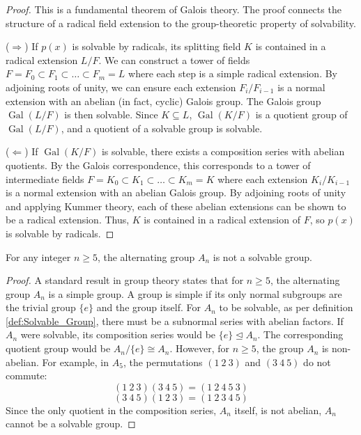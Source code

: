 \begin{proof}
    This is a fundamental theorem of Galois theory. The proof connects the structure of a radical field extension to the group-theoretic property of solvability.

    ($\Rightarrow$) If $p(x)$ is solvable by radicals, its splitting field $K$ is contained in a radical extension $L/F$. We can construct a tower of fields $F=F_0 \subset F_1 \subset \dots \subset F_m=L$ where each step is a simple radical extension. By adjoining roots of unity, we can ensure each extension $F_i/F_{i-1}$ is a normal extension with an abelian (in fact, cyclic) Galois group. The Galois group $\operatorname{Gal}(L/F)$ is then solvable. Since $K \subseteq L$, $\operatorname{Gal}(K/F)$ is a quotient group of $\operatorname{Gal}(L/F)$, and a quotient of a solvable group is solvable.

    ($\Leftarrow$) If $\operatorname{Gal}(K/F)$ is solvable, there exists a composition series with abelian quotients. By the Galois correspondence, this corresponds to a tower of intermediate fields $F=K_0 \subset K_1 \subset \dots \subset K_m=K$ where each extension $K_i/K_{i-1}$ is a normal extension with an abelian Galois group. By adjoining roots of unity and applying Kummer theory, each of these abelian extensions can be shown to be a radical extension. Thus, $K$ is contained in a radical extension of $F$, so $p(x)$ is solvable by radicals.
\end{proof}

\begin{lemma}
    \label{lem:Insolvability_of_An}
    For any integer $n \geq 5$, the alternating group $A_n$ is not a solvable group.
\end{lemma}

\begin{proof}
    A standard result in group theory states that for $n \geq 5$, the alternating group $A_n$ is a simple group. A group is simple if its only normal subgroups are the trivial group $\{e\}$ and the group itself.
    For $A_n$ to be solvable, as per definition \ref{def:Solvable_Group}, there must be a subnormal series with abelian factors. If $A_n$ were solvable, its composition series would be $\{e\} \trianglelefteq A_n$. The corresponding quotient group would be $A_n / \{e\} \cong A_n$.
    However, for $n \geq 5$, the group $A_n$ is non-abelian. For example, in $A_5$, the permutations $(1 \ 2 \ 3)$ and $(3 \ 4 \ 5)$ do not commute:
    \[ (1 \ 2 \ 3)(3 \ 4 \ 5) = (1 \ 2 \ 4 \ 5 \ 3) \]
    \[ (3 \ 4 \ 5)(1 \ 2 \ 3) = (1 \ 2 \ 3 \ 4 \ 5) \]
    Since the only quotient in the composition series, $A_n$ itself, is not abelian, $A_n$ cannot be a solvable group.
\end{proof}

